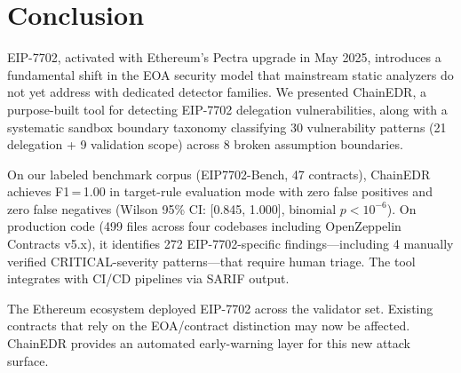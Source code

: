 \section{Conclusion}
\label{sec:conclusion}

EIP-7702, activated with Ethereum's Pectra upgrade in May 2025, introduces a fundamental shift in the EOA security model that mainstream static analyzers do not yet address with dedicated detector families. We presented ChainEDR, a purpose-built tool for detecting EIP-7702 delegation vulnerabilities, along with a systematic sandbox boundary taxonomy classifying 30 vulnerability patterns (21 delegation + 9 validation scope) across 8 broken assumption boundaries.

On our labeled benchmark corpus (EIP7702-Bench, 47 contracts), ChainEDR achieves F1\,=\,1.00 in target-rule evaluation mode with zero false positives and zero false negatives (Wilson 95\% CI: [0.845, 1.000], binomial $p < 10^{-6}$). On production code (499 files across four codebases including OpenZeppelin Contracts v5.x), it identifies 272 EIP-7702-specific findings---including 4 manually verified CRITICAL-severity patterns---that require human triage. The tool integrates with CI/CD pipelines via SARIF output.

The Ethereum ecosystem deployed EIP-7702 across the validator set. Existing contracts that rely on the EOA/contract distinction may now be affected. ChainEDR provides an automated early-warning layer for this new attack surface.
